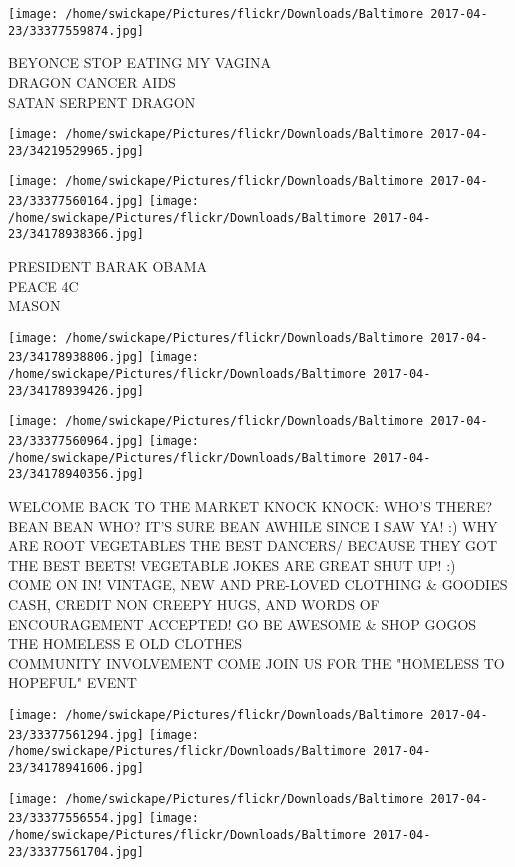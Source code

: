 \documentclass[10pt,letterpaper]{article}
\begin{document}
\texttt{[image: /home/swickape/Pictures/flickr/Downloads/Baltimore 2017-04-23/33377559874.jpg]}

BEYONCE STOP EATING MY VAGINA\\
DRAGON CANCER AIDS\\
SATAN SERPENT DRAGON\\
\pagebreak

\texttt{[image: /home/swickape/Pictures/flickr/Downloads/Baltimore 2017-04-23/34219529965.jpg]}

\vspace{0.25in}
\texttt{[image: /home/swickape/Pictures/flickr/Downloads/Baltimore 2017-04-23/33377560164.jpg]}
\texttt{[image: /home/swickape/Pictures/flickr/Downloads/Baltimore 2017-04-23/34178938366.jpg]}

PRESIDENT BARAK OBAMA\\
PEACE 4C\\
MASON\\
\pagebreak

\texttt{[image: /home/swickape/Pictures/flickr/Downloads/Baltimore 2017-04-23/34178938806.jpg]}
\texttt{[image: /home/swickape/Pictures/flickr/Downloads/Baltimore 2017-04-23/34178939426.jpg]}

\texttt{[image: /home/swickape/Pictures/flickr/Downloads/Baltimore 2017-04-23/33377560964.jpg]}
\texttt{[image: /home/swickape/Pictures/flickr/Downloads/Baltimore 2017-04-23/34178940356.jpg]}

WELCOME BACK TO THE MARKET KNOCK KNOCK: WHO'S THERE? BEAN BEAN WHO?  IT'S SURE BEAN AWHILE SINCE I SAW YA!  :) WHY ARE ROOT VEGETABLES THE BEST DANCERS/  BECAUSE THEY GOT THE BEST BEETS!  VEGETABLE JOKES ARE GREAT SHUT UP! :)\\
COME ON IN!  VINTAGE, NEW AND PRE{-}LOVED CLOTHING \& GOODIES CASH, CREDIT NON CREEPY HUGS, AND WORDS OF ENCOURAGEMENT ACCEPTED!  GO BE AWESOME \& SHOP GOGOS\\
THE HOMELESS E OLD CLOTHES\\
COMMUNITY INVOLVEMENT COME JOIN US FOR THE "HOMELESS TO HOPEFUL" EVENT\\
\pagebreak

\texttt{[image: /home/swickape/Pictures/flickr/Downloads/Baltimore 2017-04-23/33377561294.jpg]}
\texttt{[image: /home/swickape/Pictures/flickr/Downloads/Baltimore 2017-04-23/34178941606.jpg]}

\texttt{[image: /home/swickape/Pictures/flickr/Downloads/Baltimore 2017-04-23/33377556554.jpg]}
\texttt{[image: /home/swickape/Pictures/flickr/Downloads/Baltimore 2017-04-23/33377561704.jpg]}
\end{document}
